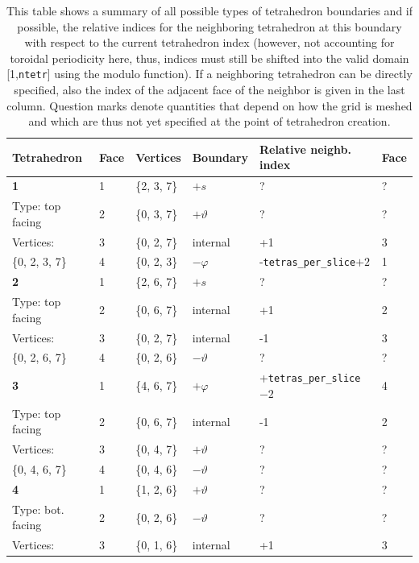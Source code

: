 \documentclass[./main.tex]{subfiles}
\begin{document}
\begin{centering}
	\begin{table}[H]
		\caption{This table shows a summary of all possible types of tetrahedron boundaries and if possible, the relative indices for the neighboring tetrahedron at this boundary with respect to the current tetrahedron index (however, not accounting for toroidal periodicity here, thus, indices must still be shifted into the valid domain [1,\texttt{ntetr}] using the modulo function). If a neighboring tetrahedron can be directly specified, also the index of the adjacent face of the neighbor is given in the last column. Question marks denote quantities that depend on how the grid is meshed and which are thus not yet specified at the point of tetrahedron creation.}
		\begin{tabular}{|l|l|l|l|l|l|}
\hline
			 \rowcolor{lightgray}
			Tetrahedron&Face&Vertices&Boundary&Relative neighb. index&Face\\
\hline	
			\textbf{1}					&1		&\{2, 3, 7\}		&$+s$			&?			&?		\\
			Type: top facing			&2		&\{0, 3, 7\}		&$+\vartheta$	&?			&?		\\
			Vertices: 	&3		&\{0, 2, 7\}		&internal		&+1			&3		\\
			\{0, 2, 3, 7\}							&4		&\{0, 2, 3\}		&$-\varphi$		&-\texttt{tetras\_per\_slice}$+2$	&1\\
\hline
			\textbf{2}					&1		&\{2, 6, 7\}		&$+s$			&?			&?		\\
			Type: top facing			&2		&\{0, 6, 7\}		&internal		&+1			&2		\\
			Vertices: 	&3		&\{0, 2, 7\}		&internal		&-1			&3		\\
			\{0, 2, 6, 7\}							&4		&\{0, 2, 6\}		&$-\vartheta$	&?			&?		\\
\hline
			\textbf{3}					&1		&\{4, 6, 7\}		&$+\varphi$		&+\texttt{tetras\_per\_slice}$-2$	&4\\
			Type: top facing			&2		&\{0, 6, 7\}		&internal		&-1			&2		\\
			Vertices: 	&3		&\{0, 4, 7\}		&$+\vartheta$	&?			&?		\\
			\{0, 4, 6, 7\}							&4		&\{0, 4, 6\}		&$-\vartheta$	&?			&?		\\
\hline
			\textbf{4}					&1		&\{1, 2, 6\}		&$+\vartheta$	&?			&?		\\
			Type: bot. facing			&2		&\{0, 2, 6\}		&$-\vartheta$	&?			&?		\\
			Vertices: 	&3		&\{0, 1, 6\}		&internal		&+1			&3		\\

\end{tabular}
\end{table}
\end{centering}
\end{document}
